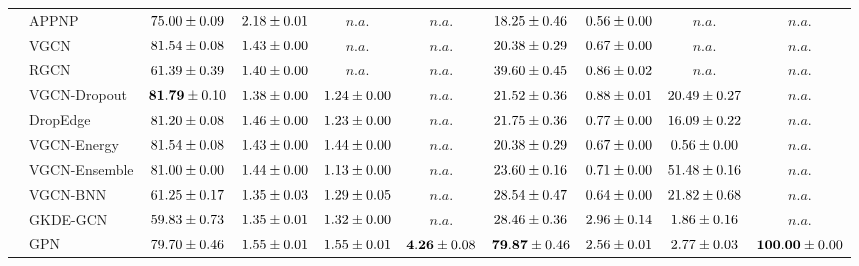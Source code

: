 \begin{table*}[!h]
{\begin{tabular}{ll|cccc|cccc}
        \midrule
        
        & APPNP & ${75.00\tiny \pm 0.09}$ & ${{2.18}\tiny \pm 0.01}$ & $n.a.$ & $n.a.$ & ${18.25\tiny \pm 0.46}$ & ${0.56\tiny \pm 0.00}$ & $n.a.$ & $n.a.$\\
        & VGCN & ${81.54\tiny \pm 0.08}$ & ${1.43\tiny \pm 0.00}$ & $n.a.$ & $n.a.$ & ${20.38\tiny \pm 0.29}$ & ${0.67\tiny \pm 0.00}$ & $n.a.$ & $n.a.$\\
        & RGCN & ${61.39\tiny \pm 0.39}$ & ${1.40\tiny \pm 0.00}$ & $n.a.$ & $n.a.$ & ${39.60\tiny \pm 0.45}$ & ${0.86\tiny \pm 0.02}$ & $n.a.$ & $n.a.$\\
        & VGCN-Dropout & ${\mathbf{81.79}\tiny \pm 0.10}$ & ${1.38\tiny \pm 0.00}$ & ${1.24\tiny \pm 0.00}$ & $n.a.$ & ${21.52\tiny \pm 0.36}$ & ${0.88\tiny \pm 0.01}$ & ${20.49\tiny \pm 0.27}$ & $n.a.$\\
        & DropEdge & ${81.20\tiny \pm 0.08}$ & ${1.46\tiny \pm 0.00}$ & ${1.23\tiny \pm 0.00}$ & $n.a.$ & ${21.75\tiny \pm 0.36}$ & ${0.77\tiny \pm 0.00}$ & ${16.09\tiny \pm 0.22}$ & $n.a.$\\
        & VGCN-Energy & ${81.54\tiny \pm 0.08}$ & ${1.43\tiny \pm 0.00}$ & ${1.44\tiny \pm 0.00}$ & $n.a.$ & ${20.38\tiny \pm 0.29}$ & ${0.67\tiny \pm 0.00}$ & ${0.56\tiny \pm 0.00}$ & $n.a.$\\
        & VGCN-Ensemble & ${81.00\tiny \pm 0.00}$ & ${1.44\tiny \pm 0.00}$ & ${1.13\tiny \pm 0.00}$ & $n.a.$ & ${23.60\tiny \pm 0.16}$ & ${0.71\tiny \pm 0.00}$ & ${{51.48}\tiny \pm 0.16}$ & $n.a.$\\
        & VGCN-BNN & ${61.25\tiny \pm 0.17}$ & ${1.35\tiny \pm 0.03}$ & ${1.29\tiny \pm 0.05}$ & $n.a.$ & ${28.54\tiny \pm 0.47}$ & ${0.64\tiny \pm 0.00}$ & ${21.82\tiny \pm 0.68}$ & $n.a.$\\
        & GKDE-GCN & ${59.83\tiny \pm 0.73}$ & ${1.35\tiny \pm 0.01}$ & ${1.32\tiny \pm 0.00}$ & $n.a.$ & ${28.46\tiny \pm 0.36}$ & ${2.96\tiny \pm 0.14}$ & ${1.86\tiny \pm 0.16}$ & $n.a.$\\
        & GPN & ${79.70\tiny \pm 0.46}$ & ${1.55\tiny \pm 0.01}$ & ${{1.55}\tiny \pm 0.01}$ & ${\mathbf{4.26}\tiny \pm 0.08}$ & ${\mathbf{79.87}\tiny \pm 0.46}$ & ${2.56\tiny \pm 0.01}$ & ${2.77\tiny \pm 0.03}$ & ${\mathbf{100.00}\tiny \pm 0.00}$\\


\end{tabular}}
\end{table*}
